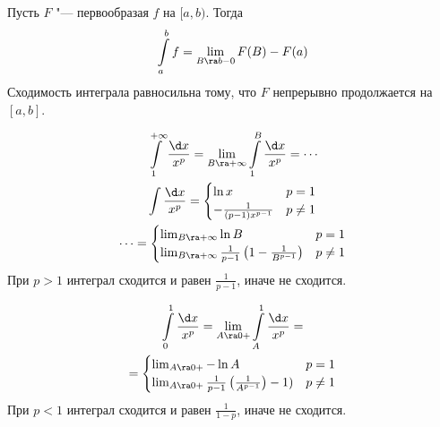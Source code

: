 \begin{Rem}
	Пусть $F$ "--- первообразая $f$ на $[a, b)$.
	Тогда
	\[ \int\limits_a^b f = \lim_{B \ra b-0} F(B) - F(a) \]
	Сходимость интеграла равносильна тому, что $F$ непрерывно продолжается на $[a, b]$.
\end{Rem}

\begin{exmp}
	\begin{gather*}
		\int\limits_1^{+\infty} \frac{\d x}{x^p} = \lim_{B \ra +\infty} \int\limits_1^B \frac{\d x}{x^p} = \cdots \\
		\int \frac{\d x}{x^p} = \begin{cases}
			\ln x & p = 1 \\
			-\frac1{(p-1)x^{p-1}} & p \ne 1
		\end{cases} \\
		\cdots = \begin{cases}
			\lim_{B \ra +\infty} \ln B & p = 1 \\
			\lim_{B \ra +\infty} \frac1{p-1}\left(1-\frac1{B^{p-1}}\right) & p \ne 1
		\end{cases}
	\end{gather*}
	При $p > 1$ интеграл сходится и равен $\frac1{p - 1}$, иначе не сходится.
\end{exmp}

\begin{exmp}
	\begin{gather*}
		\int\limits_0^1 \frac{\d x}{x^p} = \lim_{A \ra 0+} \int\limits_A^1 \frac{\d x}{x^p} = \\
		= \begin{cases}
			\lim_{A \ra 0+} -\ln A & p = 1 \\
			\lim_{A \ra 0+} \frac1{p-1}\left(\frac1{A^{p-1}}\right)-1) & p \ne 1
		\end{cases}
	\end{gather*}
	При $p < 1$ интеграл сходится и равен $\frac1{1 - p}$, иначе не сходится.
\end{exmp}

